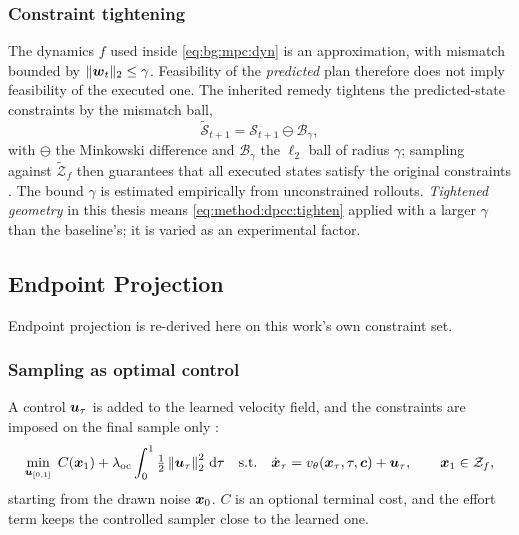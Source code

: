 \subsubsection*{Constraint tightening}

The dynamics $f$ used inside \eqref{eq:bg:mpc:dyn} is an approximation, with mismatch bounded
by $\|\boldsymbol{w}_{t}\|_{2}\le\gamma$. Feasibility of the \emph{predicted} plan therefore does not
imply feasibility of the executed one. The inherited remedy tightens the predicted-state
constraints by the mismatch ball,
\begin{equation}\label{eq:method:dpcc:tighten}
  \tilde{\mathcal{S}}_{t+1} = \mathcal{S}_{t+1}\ominus\mathcal{B}_{\gamma},
\end{equation}
with $\ominus$ the Minkowski difference and $\mathcal{B}_{\gamma}$ the $\ell_{2}$ ball of radius
$\gamma$; sampling against $\tilde{\mathcal{Z}}_{f}$ then guarantees that all executed states
satisfy the original constraints \parencite[Theorem~2]{romer2025diffusion}. The bound $\gamma$ is
estimated empirically from unconstrained rollouts. \emph{Tightened geometry} in this thesis
means \eqref{eq:method:dpcc:tighten} applied with a larger $\gamma$ than the baseline's; it is varied
as an experimental factor.

\subsection{Endpoint Projection}\label{sec:method:hardflow}

Endpoint projection \parencite{li2025hardflow} is re-derived here on this work's own constraint set.

\subsubsection*{Sampling as optimal control}

A control $\boldsymbol{u}_{\tau}$ is added to the learned velocity field, and the constraints are imposed on
the final sample only \parencite[Problem~1]{li2025hardflow}:
\begin{equation}\label{eq:method:hf:oc}
  \min_{\boldsymbol{u}_{[0,1]}}\; C(\boldsymbol{x}_{1})
    + \lambda_{\textrm{oc}}\int_{0}^{1}\tfrac{1}{2}\left\|\boldsymbol{u}_{\tau}\right\|_{2}^{2}\,\mathrm{d}\tau
  \quad\text{s.t.}\quad
  \dot{\boldsymbol{x}}_{\tau} = v_{\theta}(\boldsymbol{x}_{\tau},\tau,\boldsymbol{c}) + \boldsymbol{u}_{\tau},
  \qquad \boldsymbol{x}_{1}\in\mathcal{Z}_{f},
\end{equation}
starting from the drawn noise $\boldsymbol{x}_{0}$. $C$ is an optional terminal cost, and the effort term keeps
the controlled sampler close to the learned one.

